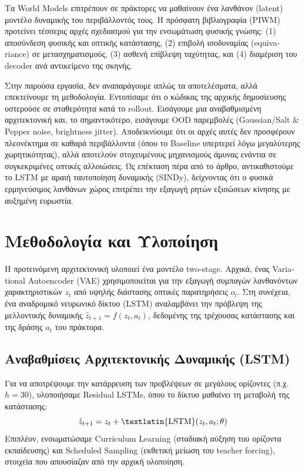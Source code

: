 \documentclass[conference, a4paper]{IEEEtran}
\begin{document}
Τα \textlatin{World Models} επιτρέπουν σε πράκτορες να μαθαίνουν ένα λανθάνον (\textlatin{latent}) μοντέλο δυναμικής του περιβάλλοντός τους. Η πρόσφατη βιβλιογραφία (\textlatin{PIWM}) προτείνει τέσσερις αρχές σχεδιασμού για την ενσωμάτωση φυσικής γνώσης: (1) αποσύνδεση φυσικής και οπτικής κατάστασης, (2) επιβολή ισοδυναμίας (\textlatin{equivariance}) σε μετασχηματισμούς, (3) ασθενή επίβλεψη ταχύτητας, και (4) διαμέριση του \textlatin{decoder} ανά αντικείμενο της σκηνής.

Στην παρούσα εργασία, δεν αναπαράγουμε απλώς τα αποτελέσματα, αλλά επεκτείνουμε τη μεθοδολογία. Εντοπίσαμε ότι ο κώδικας της αρχικής δημοσίευσης υστερούσε σε σταθερότητα κατά το \textlatin{rollout}. Εισάγουμε μια αναβαθμισμένη αρχιτεκτονική και, το σημαντικότερο, εισάγουμε \textlatin{OOD} παρεμβολές (\textlatin{Gaussian/Salt \& Pepper noise}, \textlatin{brightness jitter}). Αποδεικνύουμε ότι οι αρχές αυτές δεν προσφέρουν πλεονέκτημα σε καθαρά περιβάλλοντα (όπου το \textlatin{Baseline} υπερτερεί λόγω μεγαλύτερης χωρητικότητας), αλλά αποτελούν στοχευμένους μηχανισμούς άμυνας ενάντια σε συγκεκριμένες οπτικές αλλοιώσεις. Ως επέκταση πέρα από το άρθρο, αντικαθιστούμε το \textlatin{LSTM} με αραιή ταυτοποίηση δυναμικής (\textlatin{SINDy}), δείχνοντας ότι ο φυσικά ερμηνεύσιμος λανθάνων χώρος επιτρέπει την εξαγωγή ρητών εξισώσεων κίνησης με αυξημένη ευρωστία.

\section{\textbf{Μεθοδολογία και Υλοποίηση}}
\label{sec:method}

Η προτεινόμενη αρχιτεκτονική υλοποιεί ένα μοντέλο \textlatin{two-stage}. Αρχικά, ένας \textlatin{Variational Autoencoder} (\textlatin{VAE}) χρησιμοποιείται για την εξαγωγή συμπαγών λανθανόντων χαρακτηριστικών $z_t$ από υψηλής διάστασης οπτικές παρατηρήσεις $o_t$. Στη συνέχεια, ένα αναδρομικό νευρωνικό δίκτυο (\textlatin{LSTM}) αναλαμβάνει την πρόβλεψη της μελλοντικής δυναμικής $\hat{z}_{t+1} = f(z_t, a_t)$, δεδομένης της τρέχουσας κατάστασης και της δράσης $a_t$ του πράκτορα.

\subsection{\textbf{Αναβαθμίσεις Αρχιτεκτονικής Δυναμικής (\textlatin{LSTM})}}
Για να αποτρέψουμε την κατάρρευση των προβλέψεων σε μεγάλους ορίζοντες (π.χ. $h=30$), υλοποιήσαμε \textlatin{Residual LSTMs}, όπου το δίκτυο μαθαίνει τη μεταβολή της κατάστασης:
\begin{equation}
    \hat{z}_{t+1} = z_t + \text{\textlatin{LSTM}}(z_t, a_t; \theta)
\end{equation}
Επιπλέον, ενσωματώσαμε \textlatin{Curriculum Learning} (σταδιακή αύξηση του ορίζοντα εκπαίδευσης) και \textlatin{Scheduled Sampling} (εκθετική μείωση του \textlatin{teacher forcing}), στοιχεία που απουσίαζαν από την αρχική υλοποίηση.
\end{document}

